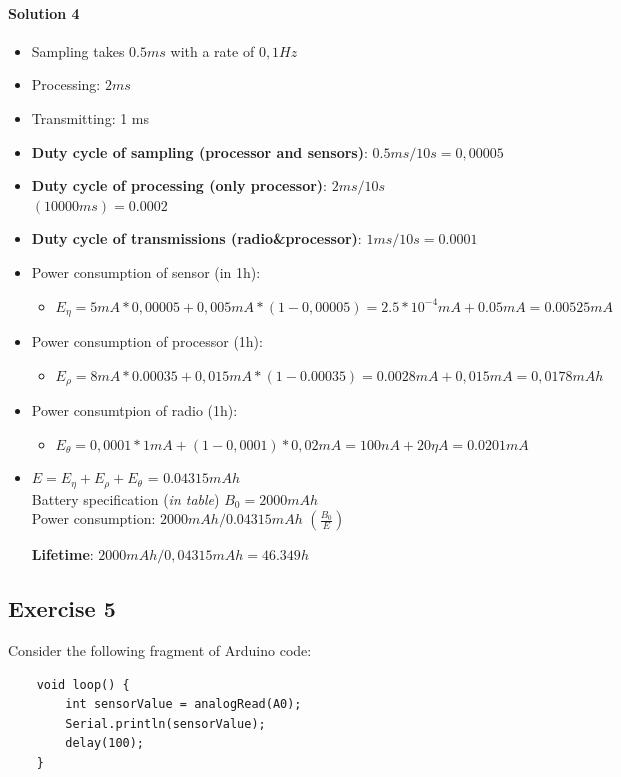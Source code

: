 \paragraph{Solution 4}\label{sec:solution-4}\begin{itemize}
	\item 
	Sampling takes $0.5 ms$ with a rate of $0,1 Hz$
	\item 
	Processing: $2 ms$
	\item 
	Transmitting: 1 ms
	\item 
	\textbf{Duty cycle of sampling (processor and sensors)}: $0.5 ms /10s = 0,00005$
	\item 
	\textbf{Duty cycle of processing (only processor)}: $2ms/10s$  $(10000ms) = 0.0002$
	\item 
	\textbf{Duty cycle of transmissions (radio\&processor)}: $1ms/10s  = 0.0001$
	\item 
	Power consumption of sensor (in 1h):
	\begin{itemize}
		\item 
		$E_{\eta} = 5 mA * 0,00005+ 0,005 mA * (1-0,00005) = 2.5*10^{-4} mA + 0.05 mA = 0.00525 mA$
	\end{itemize}
	\item 
	Power consumption of processor (1h):
	\begin{itemize}
		\item 
		$E_{\rho} = 8 mA * 0.00035 + 0,015 mA *(1-0.00035) = 0.0028 mA+0,015 mA = 0,0178 mAh$
	\end{itemize}
	\item 
	Power consumtpion of radio (1h):
	\begin{itemize}
		\item 
		$E_{\theta} = 0,0001 * 1mA + (1-0,0001) *0,02 mA = 100 nA + 20 \eta A = 0.0201 mA$
		
	\end{itemize}
	\item \begin{center}
		$E = E_{\eta} + E_{\rho} + E_{\theta}$ = $0.04315 mAh$\\
		Battery specification (\textit{in table}) $B_{0} = 2000mAh$\\
		Power consumption: $2000 mAh / 0.04315 mAh$     $(\frac{B_{0}}{E})$\\
	\end{center}
	\textbf{Lifetime}: $2000 mAh / 0,04315 mAh = 46.349 h$
\end{itemize}


\subsection{Exercise 5}\label{sec:exercise}
Consider the following fragment of Arduino code:
\begin{lstlisting}
	void loop() { 
		int sensorValue = analogRead(A0);
		Serial.println(sensorValue); 
		delay(100);
	}
\end{lstlisting}

